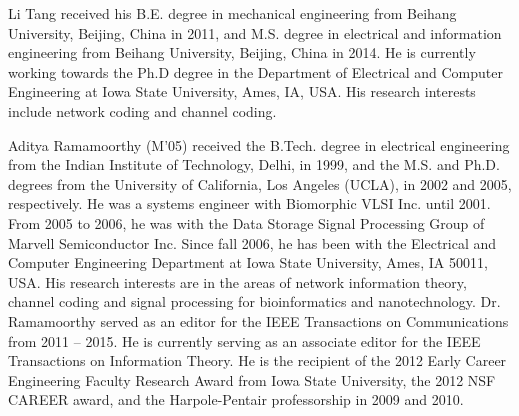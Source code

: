 \documentclass[journal,twocolumn]{IEEEtran}
\theoremstyle{definition}
\newcommand{\calI}{\mathcal{I}}
\newcommand{\bfg}{\mathbf{g}}
\newcommand{\bfv}{\mathbf{v}}
\newcommand{\bfu}{\mathbf{u}}
\newcommand{\bfT}{\mathbf{T}}
\begin{document}
\begin{IEEEbiographynophoto}{Li Tang} received his   B.E. degree in mechanical engineering from Beihang University, Beijing, China in 2011, and M.S. degree in electrical and information engineering from Beihang University, Beijing, China in 2014.  He is currently working towards the Ph.D degree in the Department of Electrical and Computer  Engineering at Iowa State University, Ames, IA, USA. His research interests include network coding and channel coding.
\end{IEEEbiographynophoto}

\begin{IEEEbiographynophoto}{Aditya Ramamoorthy}
(M'05) received the B.Tech. degree in electrical engineering from the Indian Institute of Technology, Delhi, in 1999, and the M.S. and Ph.D. degrees from the University of California, Los Angeles (UCLA), in 2002 and 2005, respectively. He was a systems engineer with Biomorphic VLSI Inc. until 2001. From 2005 to 2006, he was with the Data Storage Signal Processing Group of Marvell Semiconductor Inc. Since fall 2006, he has been with the Electrical and Computer Engineering Department at Iowa State University, Ames, IA 50011, USA. His research interests are in the areas of network information theory, channel coding and signal processing for bioinformatics and nanotechnology. Dr. Ramamoorthy served as an editor for the IEEE Transactions on Communications from 2011 -- 2015. He is currently serving as an associate editor for the IEEE Transactions on Information Theory. He is the recipient of the 2012 Early Career Engineering Faculty Research Award from Iowa State University, the 2012 NSF CAREER award, and the Harpole-Pentair professorship in 2009 and 2010.
\end{IEEEbiographynophoto}

 
\end{document}
